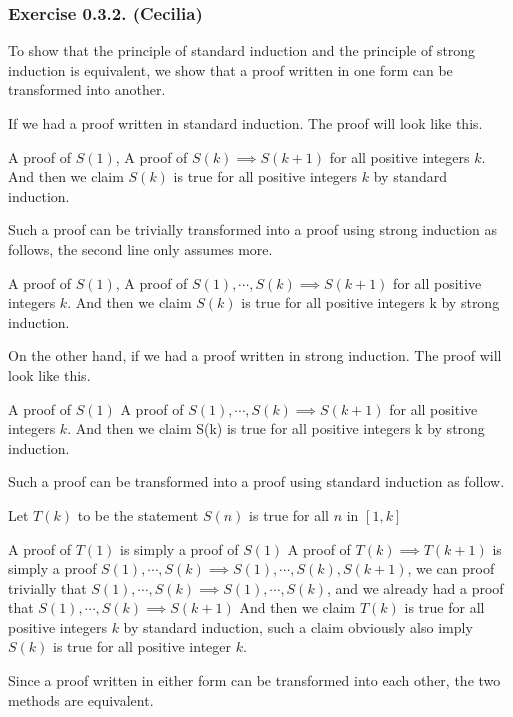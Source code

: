 \subsubsection*{Exercise 0.3.2. (Cecilia)}

\begin{flushleft}
To show that the principle of standard induction and the principle of strong induction is equivalent, we show that a proof written in one form can be transformed into another. 
\vspace{10px}

If we had a proof written in standard induction. The proof will look like this.
\vspace{10px}

A proof of $S(1)$,
A proof of $S(k) \implies S(k + 1)$ for all positive integers $k$.
And then we claim $S(k)$ is true for all positive integers $k$ by standard induction.
\vspace{10px}

Such a proof can be trivially transformed into a proof using strong induction as follows, 
the second line only assumes more.
\vspace{10px}

A proof of $S(1)$,
A proof of $S(1), \cdots, S(k) \implies S(k + 1)$ for all positive integers $k$.
And then we claim $S(k)$ is true for all positive integers k by strong induction.
\vspace{10px}

On the other hand, if we had a proof written in strong induction. 
The proof will look like this.
\vspace{10px}

A proof of $S(1)$
A proof of $S(1), \cdots, S(k) \implies S(k + 1)$ for all positive integers $k$.
And then we claim S(k) is true for all positive integers k by strong induction.
\vspace{10px}

Such a proof can be transformed into a proof using standard induction as follow. 
\vspace{10px}

Let $T(k)$ to be the statement $S(n)$ is true for all $n$ in $[1, k]$
\vspace{10px}

A proof of $T(1)$ is simply a proof of $S(1)$
A proof of $T(k) \implies T(k + 1)$ is simply a proof 
$S(1), \cdots, S(k) \implies S(1), \cdots, S(k), S(k + 1)$, 
we can proof trivially that $S(1), \cdots, S(k) \implies S(1), \cdots, S(k)$, 
and we already had a proof that $S(1), \cdots, S(k) \implies S(k + 1)$
And then we claim $T(k)$ is true for all positive integers $k$ by standard induction, 
such a claim obviously also imply $S(k)$ is true for all positive integer $k$.
\vspace{10px}

Since a proof written in either form can be transformed into each other, 
the two methods are equivalent.
\vspace{10px}

\end{flushleft}